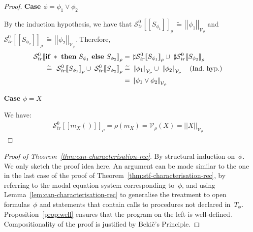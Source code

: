 \documentclass[10pt,a4paper]{amsart}
\theoremstyle{definition}
\newcommand{\denot}[1]{\left[\!\left[#1\right]\!\right]}
\newcommand{\trcdenoth}[1]{\mathcal{S}^0_{\mathit{tr}}\!\denot{#1}}
\newcommand{\logdenotV}[2]{\left|\!\left|#1\right|\!\right|_{#2}}
\newcommand{\chop}[0]{\raisebox{1ex}{$\frown$}}
\newcommand{\If}{\mbox{\bf if}}
\newcommand{\Then}{\mbox{\bf then}}
\newcommand{\Else}{\mbox{\bf else}}
\begin{document}
\begin{proof}
  \noindent\textbf{Case $\phi = \phi_1 \lor \phi_2$} 

  By the induction hypothesis, we have that
  $\trcdenoth{S_{\phi_1}}_\rho \,\widetilde{=}\, 
   \logdenotV{\phi_1}{\mathcal{V}_\rho}$
  and
  $\trcdenoth{S_{\phi_2}}_\rho \,\widetilde{=}\, 
   \logdenotV{\phi_2}{\mathcal{V}_\rho}$.
  Therefore,
  \begin{align*}
    \trcdenoth{\If\ \ast\ \Then\ S_{\phi_1}\ \Else\ S_{\phi_2}}_\rho
    & =\, \sharp\trcdenoth{S_{\phi_1}}_\rho\cup\;\sharp\trcdenoth{S_{\phi_2}}_\rho\\
     \;\widetilde{=}\ \ \trcdenoth{S_{\phi_1}}_\rho\cup\;\trcdenoth{S_{\phi_2}}_\rho 
    & \;\widetilde{=}\ \logdenotV{\phi_1}{\mathcal{V}_\rho} \cup\ 
            \logdenotV{\phi_2}{\mathcal{V}_\rho}\quad\text{(Ind.\ hyp.)}\\
    & =\, \logdenotV{\phi_1\lor\phi_2}{\mathcal{V}_\rho}
  \end{align*}

  
  \noindent\textbf{Case $\phi = X$}

  We have:
  \begin{align*}
    \trcdenoth{m_X ()}_\rho
     = \rho (m_X) 
     = \mathcal{V}_\rho (X) 
     = \logdenotV{X}{\mathcal{V}_\rho}
  \end{align*}
\end{proof}

\begin{proof}[Proof of Theorem~\ref{thm:can-characterisation-rec}]
  By structural induction on~$\phi$.  We only sketch the proof idea
  here.  An argument can be made similar to the one in the last case
  of the proof of Theorem~\ref{thm:stf-characterisation-rec}, by
  referring to the modal equation system corresponding to~$\phi$, and
  using Lemma~\ref{lem:can-characterisation-rec} to generalise the
  treatment to open formulas~$\phi$ and statements that contain calls
  to procedures not declared in~$T_\phi$.  Proposition~\ref{prop:well}
  ensures that the program on the left is well-defined.
  Compositionality of the proof is justified by Beki\v{c}'s
  Principle. %
\end{proof}
\end{document}
